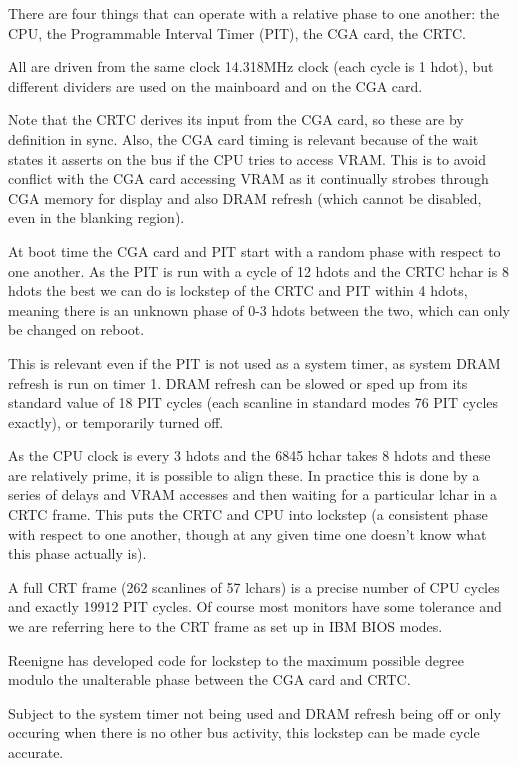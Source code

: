 \documentclass[a4paper,10pt]{amsart}
\begin{document}
There are four things that can operate with a relative phase to one another:
the CPU, the Programmable Interval Timer (PIT), the CGA card, the CRTC.

All are driven from the same clock 14.318MHz clock (each cycle is 1 hdot), but
different dividers are used on the mainboard and on the CGA card.

Note that the CRTC derives its input from the CGA card, so these are by
definition in sync. Also, the CGA card timing is relevant because of the wait
states it asserts on the bus if the CPU tries to access VRAM. This is to avoid
conflict with the CGA card accessing VRAM as it continually strobes through CGA
memory for display and also DRAM refresh (which cannot be disabled, even in the
blanking region).

At boot time the CGA card and PIT start with a random phase with respect to
one another. As the PIT is run with a cycle of 12 hdots and the CRTC hchar is
8 hdots the best we can do is lockstep of the CRTC and PIT within 4 hdots,
meaning there is an unknown phase of 0-3 hdots between the two, which can only
be changed on reboot.

This is relevant even if the PIT is not used as a system timer, as system DRAM
refresh is run on timer 1. DRAM refresh can be slowed or sped up from its
standard value of 18 PIT cycles (each scanline in standard modes 76 PIT
cycles exactly), or temporarily turned off.

As the CPU clock is every 3 hdots and the 6845 hchar takes 8 hdots and these
are relatively prime, it is possible to align these. In practice this is done
by a series of delays and VRAM accesses and then waiting for a particular
lchar in a CRTC frame. This puts the CRTC and CPU into lockstep (a consistent
phase with respect to one another, though at any given time one doesn't know
what this phase actually is).

A full CRT frame (262 scanlines of 57 lchars) is a precise number of CPU cycles
and exactly 19912 PIT cycles. Of course most monitors have some tolerance and
we are referring here to the CRT frame as set up in IBM BIOS modes.

Reenigne has developed code for lockstep to the maximum possible degree modulo
the unalterable phase between the CGA card and CRTC.

Subject to the system timer not being used and DRAM refresh being off or only
occuring when there is no other bus activity, this lockstep can be made cycle
accurate.
\end{document}
